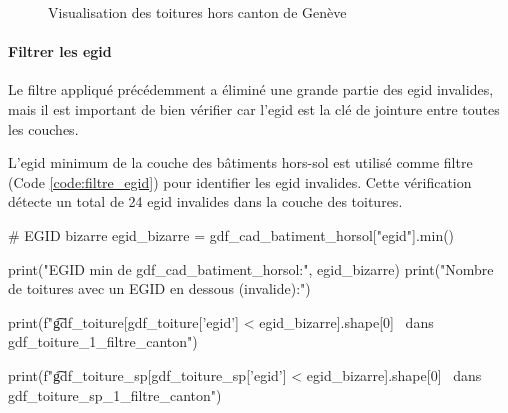 \begin{figure}[H]
    \caption{Visualisation des toitures hors canton de Genève}
    \label{fig:ch3_preparation_donnees_03_hors_canton}
\end{figure}

\newpage
\paragraph{Filtrer les \gls{egid}}
Le filtre appliqué précédemment a éliminé une grande partie des \gls{egid} invalides, mais il est important de bien vérifier car l'\gls{egid} est la clé de jointure entre toutes les couches.

L'\gls{egid} minimum de la couche des bâtiments hors-sol est utilisé comme filtre (Code \ref{code:filtre_egid}) pour identifier les \gls{egid} invalides. Cette vérification détecte un total de 24 \gls{egid} invalides dans la couche des toitures.

\vspace{0.35cm}
\begin{pythoncode}
# EGID bizarre
egid_bizarre = gdf_cad_batiment_horsol["egid"].min()

print("EGID min de gdf_cad_batiment_horsol:", egid_bizarre)
print("Nombre de toitures avec un EGID en dessous (invalide):")

print(f"\t{gdf_toiture[gdf_toiture['egid'] < egid_bizarre].shape[0]} \
dans gdf_toiture_1_filtre_canton")

print(f"\t{gdf_toiture_sp[gdf_toiture_sp['egid'] < egid_bizarre].shape[0]} \
dans gdf_toiture_sp_1_filtre_canton")
\end{pythoncode}

